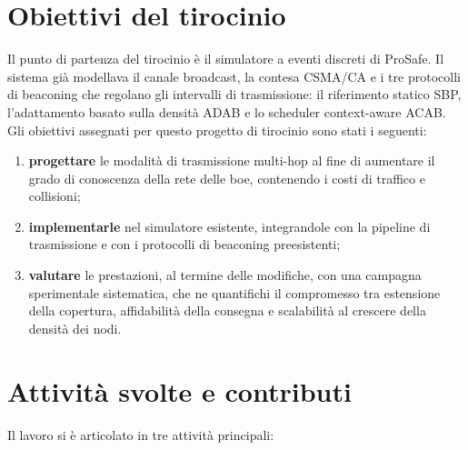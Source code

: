 \section{Obiettivi del tirocinio}
\label{sec:intro-obiettivi}
Il punto di partenza del tirocinio \`e il simulatore a eventi discreti di
ProSafe. Il sistema gi\`a modellava il canale broadcast, la contesa CSMA/CA e i tre protocolli di
beaconing che regolano gli intervalli di trasmissione: il riferimento statico
SBP, l'adattamento basato sulla densit\`a ADAB e lo scheduler
context-aware ACAB. Gli obiettivi assegnati per questo progetto di tirocinio sono
stati i seguenti:
\begin{enumerate}[leftmargin=1.4em]
  \item \textbf{progettare} le modalit\`a di trasmissione multi-hop al fine di
  aumentare il grado di conoscenza della rete delle boe, contenendo i costi di traffico e collisioni;
  \item \textbf{implementarle} nel simulatore esistente, integrandole con la
  pipeline di trasmissione e con i protocolli di beaconing preesistenti;
  \item \textbf{valutare} le prestazioni, al termine delle modifiche, con una campagna sperimentale sistematica, 
  che ne quantifichi il compromesso tra estensione della copertura, affidabilit\`a
  della consegna e scalabilit\`a al crescere della densit\`a dei nodi.
\end{enumerate}

\section{Attivit\`a svolte e contributi}
\label{sec:intro-contributi}
Il lavoro si \`e articolato in tre attivit\`a principali:

